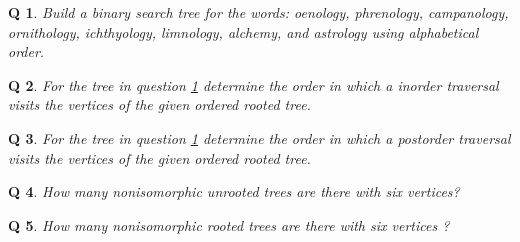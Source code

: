 \documentclass[12pt]{article}
\newtheorem{q} {Q}
\begin{document}
\begin{q} \label{q:questao0} Build a binary search tree for the words: {\em oenology, phrenology, campanology, ornithology, ichthyology, limnology, alchemy,} and {\em astrology} using alphabetical order.\end{q}\newpage
\begin{q}  For the tree in question \ref{q:questao0}  determine the order in which a inorder traversal visits the vertices of the given ordered rooted tree.                \end{q}\newpage
\begin{q}  For the tree in question \ref{q:questao0}  determine the order in which a postorder traversal visits the vertices of the given ordered rooted tree.             \end{q}\newpage
\begin{q}  How many nonisomorphic unrooted trees are there with six vertices? \end{q}\newpage
\begin{q} How many nonisomorphic rooted trees are there with six vertices ?\end{q}\newpage

\end{document}

